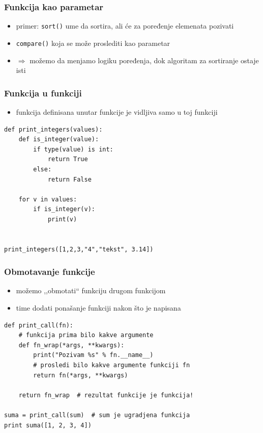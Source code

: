 \documentclass[compress]{beamer}
\begin{document}
\begin{frame}[fragile]
  \frametitle{Funkcija kao parametar}
  \begin{itemize}
    \item primer: \texttt{sort()} ume da sortira, ali će za poređenje elemenata pozivati
    \item \texttt{compare()} koja se može proslediti kao parametar
    \item $\Rightarrow$ možemo da menjamo logiku poređenja, dok algoritam za sortiranje ostaje isti
  \end{itemize}
\end{frame}

\begin{frame}[fragile]
  \frametitle{Funkcija u funkciji}
  \begin{itemize}
    \item funkcija definisana unutar funkcije je vidljiva samo u toj funkciji
  \end{itemize}
\begin{verbatim}
def print_integers(values):
    def is_integer(value):
        if type(value) is int:
            return True
        else:
            return False

    for v in values:
        if is_integer(v):
            print(v)


print_integers([1,2,3,"4","tekst", 3.14])
\end{verbatim}
\end{frame}

\begin{frame}[fragile]
  \frametitle{Obmotavanje funkcije}
  \begin{itemize}
    \item možemo ,,obmotati`` funkciju drugom funkcijom
    \item time dodati ponašanje funkciji nakon što je napisana
  \end{itemize}
\begin{verbatim}
def print_call(fn):
    # funkcija prima bilo kakve argumente
    def fn_wrap(*args, **kwargs):
        print("Pozivam %s" % fn.__name__)
        # prosledi bilo kakve argumente funkciji fn
        return fn(*args, **kwargs) 
    
    return fn_wrap  # rezultat funkcije je funkcija!

suma = print_call(sum)  # sum je ugradjena funkcija
print suma([1, 2, 3, 4])
\end{verbatim}
\end{frame}
\end{document}
